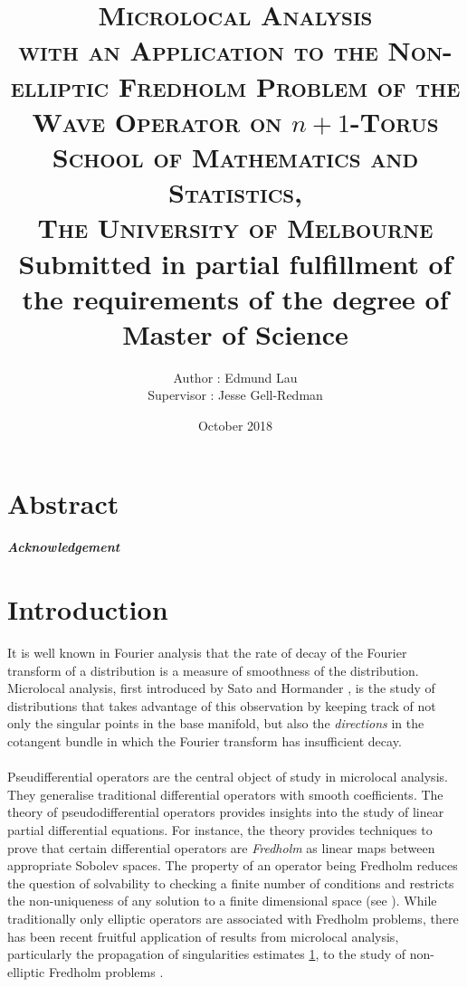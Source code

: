 \documentclass[12pt, twoside]{book}
\title{    
    \textsc{\LARGE Microlocal Analysis} \\
    \textsc{\large with an Application to the Non-elliptic Fredholm Problem of the Wave Operator on $n + 1$-Torus} \\ [5em]
    \textsc{\Large School of Mathematics and Statistics, \\ The University of Melbourne} \\ [5em]
    {\large Submitted in partial fulfillment of the requirements of the degree of Master of Science} \\
}
\author{Author : Edmund Lau \\
    Supervisor : Jesse Gell-Redman  
}
\date{October 2018}
\begin{document}
\maketitle



\chapter*{Abstract}




\paragraph{\LARGE Acknowledgement} \hfill 

\tableofcontents
\chapter{Introduction}
 It is well known in Fourier analysis that the rate of decay of the Fourier transform of a distribution is a measure of smoothness of the distribution. Microlocal analysis, first introduced by Sato \cite{} and Hormander \cite{}, is the study of distributions that takes advantage of this observation by keeping track of not only the singular points in the base manifold, but also the \textit{directions} in the cotangent bundle in which the Fourier transform has insufficient decay. \\
\\
Pseudifferential operators are the central object of study in microlocal analysis. They generalise traditional differential operators with smooth coefficients. The theory of pseudodifferential operators provides insights into the study of linear partial differential equations$  $. For instance, the theory provides techniques to prove that certain differential operators are \textit{Fredholm} as linear maps between appropriate Sobolev spaces. The property of an operator being Fredholm reduces the question of solvability to checking a finite number of conditions and restricts the non-uniqueness of any solution to a finite dimensional space (see \cite{}). While traditionally only elliptic operators are associated with Fredholm problems, there has been recent fruitful application of results from microlocal analysis, particularly the propagation of singularities estimates \ref{}, to the study of non-elliptic Fredholm problems \cite{}. \\
\\
\end{document}
